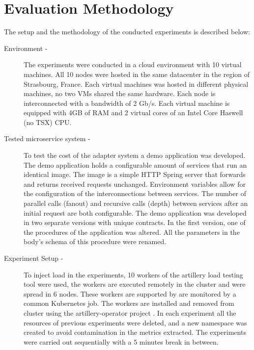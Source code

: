 \section{Evaluation Methodology} %
\label{sec:evaluation_methodology}

The setup and the methodology of the conducted experiments is described below:

\begin{description}
    \item[Environment -] The experiments were conducted in a cloud environment with 10 virtual machines.
    All 10 nodes were hosted in the same datacenter in the region of Strasbourg, France.
    Each virtual machines was hosted in different physical machines, no two VMs shared the same hardware.
    Each node is interconnected with a bandwidth of 2 Gb/s.
    Each virtual machine is equipped with 4GB of RAM and 2 virtual cores of an Intel Core Haswell (no TSX) CPU.
    \item[Tested microservice system -] To test the cost of the adapter system a demo application was developed.
    The demo application holds a configurable amount of services that run an identical image.
    The image is a simple HTTP Spring server that forwards and returns received requests unchanged.
    Environment variables allow for the configuration of the interconnections between services.
    The number of parallel calls (fanout) and recursive calls (depth) between services after an initial request are both configurable.
    The demo application was developed in two separate versions with unique contracts.
    In the first version, one of the procedures of the application was altered.
    All the parameters in the body's schema of this procedure were renamed.
    \item[Experiment Setup -] To inject load in the experiments, 10 workers of the artillery load testing tool were used,
    the workers are executed remotely in the cluster and were spread in 6 nodes.
    These workers are supported by are monitored by a common Kubernetes job.
    The workers are installed and removed from cluster using the artillery-operator project \cite{artilleryoperator}.
    In each experiment all the resources of previous experiments were deleted,
    and a new namespace was created to avoid contamination in the metrics extracted.
    The experiments were carried out sequentially with a 5 minutes break in between.


\end{description}
